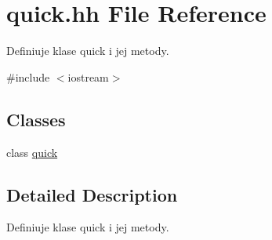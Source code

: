 \hypertarget{quick_8hh}{\section{quick.\-hh \-File \-Reference}
\label{quick_8hh}
}


\-Definiuje klase quick i jej metody.  


{\ttfamily \#include $<$iostream$>$}\*
\subsection*{\-Classes}
\begin{DoxyCompactItemize}
\item 
class \hyperlink{classquick}{quick}
\end{DoxyCompactItemize}


\subsection{\-Detailed \-Description}
\-Definiuje klase quick i jej metody. 